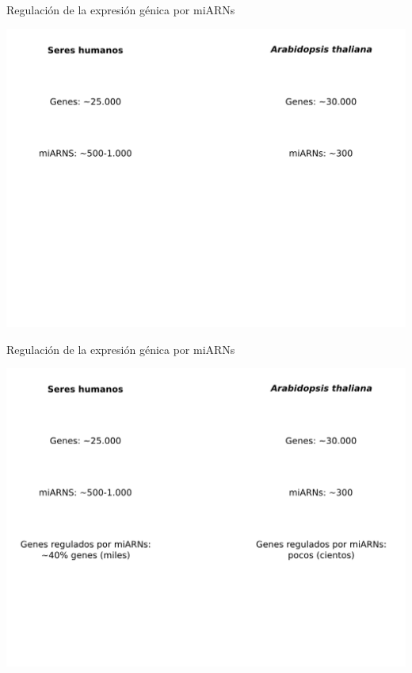 \documentclass{beamer}
\begin{document}
\begin{frame}{Regulación de la expresión génica por miARNs}
        \begin{center}
            \includegraphics[width=1\textwidth]{img/exp_gen02.png}
        \end{center}
\end{frame}

\begin{frame}{Regulación de la expresión génica por miARNs}
        \begin{center}
            \includegraphics[width=1\textwidth]{img/exp_gen03.png}
        \end{center}
\end{frame}
\end{document}
